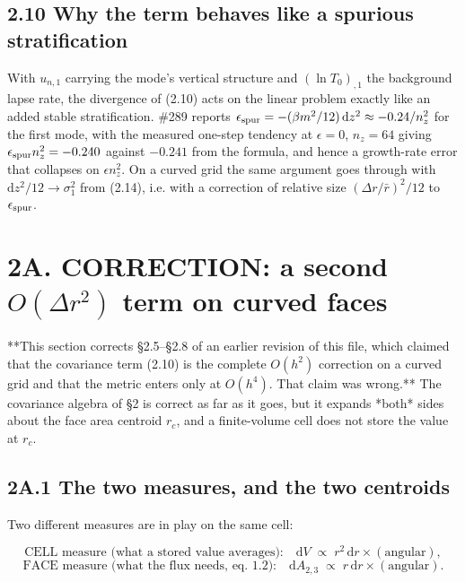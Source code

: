\documentclass[11pt,a4paper]{article}
\begin{document}
\subsection*{2.10 Why the term behaves like a spurious stratification}

With $u_{n,1}$ carrying the mode's vertical structure and $(\ln T_0)_{,1}$ the
background lapse rate, the divergence of (2.10) acts on the linear problem
exactly like an added stable stratification. \#289 reports
$\epsilon_{\rm spur} = -(\beta m^2/12)\,\mathrm{d}z^2 \approx -0.24/n_z^2$ for the
first mode, with the measured one-step tendency at $\epsilon=0$, $n_z=64$ giving
$\epsilon_{\rm spur}n_z^2=-0.240$ against $-0.241$ from the formula, and hence a
growth-rate error that collapses on $\epsilon n_z^2$. On a curved grid the same
argument goes through with $\mathrm{d}z^2/12\to\sigma_1^2$ from (2.14), i.e. with
a correction of relative size $(\Delta r/\bar r)^2/12$ to $\epsilon_{\rm spur}$.

\hrulefill

\section*{2A. CORRECTION: a second $O(\Delta r^2)$ term on curved faces}

**This section corrects §2.5–§2.8 of an earlier revision of this file, which
claimed that the covariance term (2.10) is the complete $O(h^2)$ correction on
a curved grid and that the metric enters only at $O(h^4)$. That claim was
wrong.** The covariance algebra of §2 is correct as far as it goes, but it
expands *both* sides about the face area centroid $r_c$, and a finite-volume
cell does not store the value at $r_c$.

\subsection*{2A.1 The two measures, and the two centroids}

Two different measures are in play on the same cell:

\begin{equation*}
\text{CELL measure (what a stored value averages):}\quad
\mathrm{d}V \;\propto\; r^2\,\mathrm{d}r \times (\text{angular}),
\end{equation*}
\begin{equation*}
\text{FACE measure (what the flux needs, eq. 1.2):}\quad
\mathrm{d}A_{2,3} \;\propto\; r\,\mathrm{d}r \times (\text{angular}).
\end{equation*}
\end{document}
